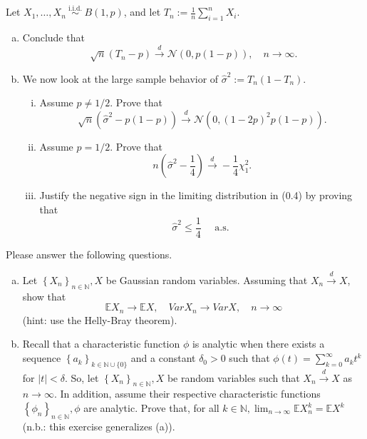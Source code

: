 \begin{ex}
    Let \(X_{1}, \ldots, X_{n} \stackrel{\text { i.i.d. }}{\sim} B(1, p)\), and let \(T_{n}:=\frac{1}{n} \sum_{i=1}^{n} X_{i}\). 
    \begin{enumerate}[(a)]
        \item Conclude that
        \[
            \sqrt{n}\left(T_{n}-p\right) \stackrel{d}{\rightarrow} \mathcal{N}(0, p(1-p)), \quad n \rightarrow \infty. 
        \]
        \item We now look at the large sample behavior of \(\widehat{\sigma}^{2}:=T_{n}\left(1-T_{n}\right)\). 
        \begin{enumerate}[(i)]
            \item Assume \(p \neq 1 / 2\). Prove that
            \[
                \sqrt{n}\left(\widehat{\sigma}^{2}-p(1-p)\right) \stackrel{d}{\rightarrow} \mathcal{N}\left(0,(1-2 p)^{2} p(1-p)\right). 
            \]
            \item Assume \(p=1 / 2\). Prove that
            \[
            n\left(\widehat{\sigma}^{2}-\frac{1}{4}\right) \stackrel{d}{\rightarrow}-\frac{1}{4} \chi_{1}^{2}. 
            \]
            \item Justify the negative sign in the limiting distribution in (0.4) by proving that
            \[
                \widehat{\sigma}^{2} \leq \frac{1}{4} \quad \text { a.s. }
            \]
        \end{enumerate}
    \end{enumerate}
\end{ex}

\begin{ex}
    Please answer the following questions. 
    \begin{enumerate}[(a)]
        \item Let \(\left\{X_{n}\right\}_{n \in \mathbb{N}}, X\) be Gaussian random variables. Assuming that \(X_{n} \stackrel{d}{\rightarrow} X\), show that
        \[
            \mathbb{E} X_{n} \rightarrow \mathbb{E} X, \quad Var X_{n} \rightarrow Var X, \quad n \rightarrow \infty
        \]
        (hint: use the Helly-Bray theorem). 
        \item Recall that a characteristic function \(\phi\) is analytic when there exists a sequence \(\left\{a_{k}\right\}_{k \in \mathbb{N} \cup\{0\}}\) and a constant \(\delta_{0}>0\) such that \(\phi(t)=\sum_{k=0}^{\infty} a_{k} t^{k}\) for \(|t|<\delta\). So, let \(\left\{X_{n}\right\}_{n \in \mathbb{N}}, X\) be random variables such that \(X_{n} \stackrel{d}{\rightarrow} X\) as \(n \rightarrow \infty\). In addition, assume their respective characteristic functions \(\left\{\phi_{n}\right\}_{n \in \mathbb{N}}, \phi\) are analytic. Prove that, for all \(k \in \mathbb{N}, \lim _{n \rightarrow \infty} \mathbb{E} X_{n}^{k}=\mathbb{E} X^{k}\) (n.b.: this exercise generalizes (a)).
    \end{enumerate}
\end{ex}

